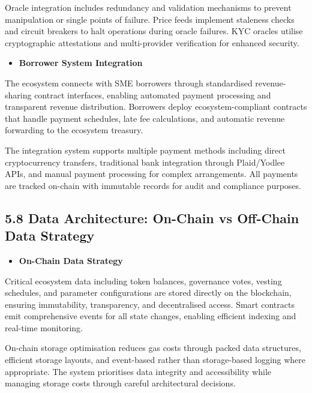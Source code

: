 \documentclass[
  paper=a4,
  ,captions=tableheading
]{scrartcl}
\providecommand{\tightlist}{%
  \setlength{\itemsep}{0pt}\setlength{\parskip}{0pt}}
\begin{document}
Oracle integration includes redundancy and validation mechanisms to
prevent manipulation or single points of failure. Price feeds implement
staleness checks and circuit breakers to halt operations during oracle
failures. KYC oracles utilise cryptographic attestations and
multi-provider verification for enhanced security.

\begin{itemize}
\tightlist
\item
  \textbf{Borrower System Integration}
\end{itemize}

The ecosystem connects with SME borrowers through standardised
revenue-sharing contract interfaces, enabling automated payment
processing and transparent revenue distribution. Borrowers deploy
ecosystem-compliant contracts that handle payment schedules, late fee
calculations, and automatic revenue forwarding to the ecosystem treasury.

The integration system supports multiple payment methods including
direct cryptocurrency transfers, traditional bank integration through
Plaid/Yodlee APIs, and manual payment processing for complex
arrangements. All payments are tracked on-chain with immutable records
for audit and compliance purposes.

\subsection{5.8 Data Architecture: On-Chain vs Off-Chain Data
Strategy}\label{data-architecture-on-chain-vs-off-chain-data-strategy}

\begin{itemize}
\tightlist
\item
  \textbf{On-Chain Data Strategy}
\end{itemize}

Critical ecosystem data including token balances, governance votes,
vesting schedules, and parameter configurations are stored directly on
the blockchain, ensuring immutability, transparency, and decentralised
access. Smart contracts emit comprehensive events for all state changes,
enabling efficient indexing and real-time monitoring.

On-chain storage optimisation reduces gas costs through packed data
structures, efficient storage layouts, and event-based rather than
storage-based logging where appropriate. The system prioritises data
integrity and accessibility while managing storage costs through careful
architectural decisions.
\end{document}
